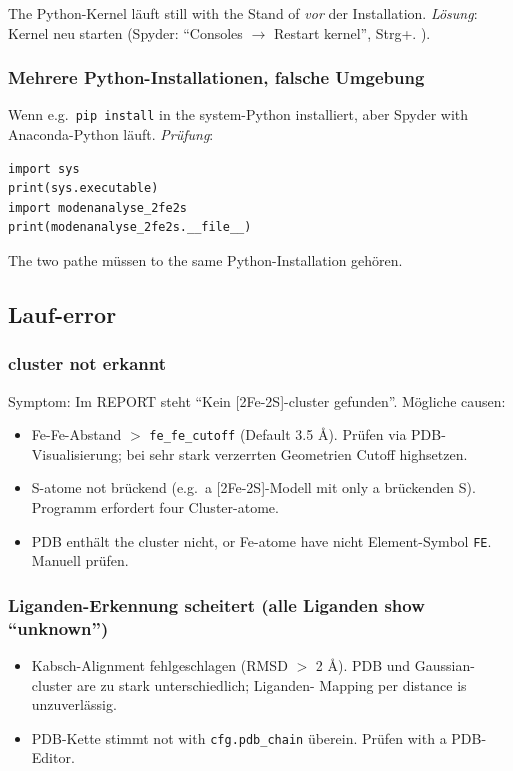 \documentclass[11pt,a4paper,twoside]{article}
\theoremstyle{remark}
\begin{document}
The Python-Kernel l\"auft still with the Stand of \emph{vor} der
Installation. \emph{L\"osung}: Kernel neu starten (Spyder:
``Consoles $\to$ Restart kernel'', Strg+. ).

\subsubsection*{Mehrere Python-Installationen, falsche Umgebung}

Wenn e.g.\ \texttt{pip install} in the system-Python installiert, aber
Spyder with Anaconda-Python l\"auft. \emph{Pr\"ufung}:

\begin{lstlisting}[style=python]
import sys
print(sys.executable)
import modenanalyse_2fe2s
print(modenanalyse_2fe2s.__file__)
\end{lstlisting}

The two pathe m\"ussen to the same Python-Installation geh\"oren.

\subsection{Lauf-error}

\subsubsection*{cluster not erkannt}

Symptom: Im REPORT steht ``Kein {[}2Fe-2S{]}-cluster gefunden''. M\"ogliche
causen:

\begin{itemize}
  \item Fe-Fe-Abstand $>$ \texttt{fe\_fe\_cutoff} (Default 3.5 \AA{}).
        Pr\"ufen via PDB-Visualisierung; bei sehr stark verzerrten
        Geometrien Cutoff highsetzen.
  \item S-atome not br\"uckend (e.g.\ a {[}2Fe-2S{]}-Modell mit
        only a br\"uckenden S). Programm erfordert four Cluster-atome.
  \item PDB enth\"alt the cluster nicht, or Fe-atome have nicht
        Element-Symbol \texttt{FE}. Manuell pr\"ufen.
\end{itemize}

\subsubsection*{Liganden-Erkennung scheitert (alle Liganden show ``unknown'')}

\begin{itemize}
  \item Kabsch-Alignment fehlgeschlagen (RMSD $>$ 2 \AA{}). PDB und
        Gaussian-cluster are zu stark unterschiedlich; Liganden-
        Mapping per distance is unzuverl\"assig.
  \item PDB-Kette stimmt not with \texttt{cfg.pdb\_chain}
        \"uberein. Pr\"ufen with a PDB-Editor.
\end{itemize}
\end{document}
